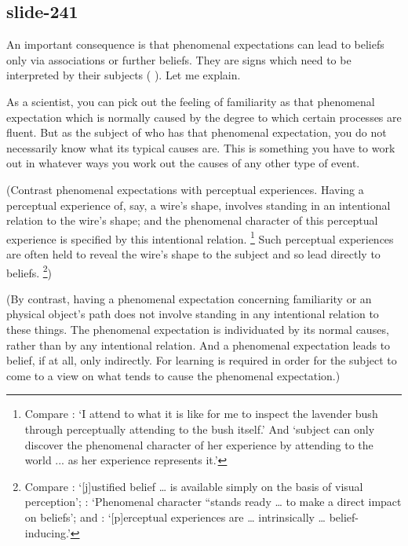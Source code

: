 \documentclass[12pt,\papersize]{extarticle}
\begin{document}
\subsection{slide-241}
An important consequence is that phenomenal expectations can lead to beliefs
only via associations or further beliefs.
They are signs which need to be interpreted by their subjects
(\citealp[Essay~II, Chap.~16, p.~228]{Reid:1785cj}
\citealp[Chap.~VI sect.~III, pp.~164–5]{Reid:1785nz}).
Let me explain.

As a scientist, you can pick out the feeling of familiarity as that
phenomenal expectation which is normally caused by the degree to which
certain processes are fluent.
But as the subject of who has that phenomenal expectation, you do not
necessarily know what its typical causes are.
This is something you have to work out in whatever ways you work out
the causes of any other type of event.

(Contrast phenomenal expectations with perceptual experiences.
Having
a perceptual experience of, say, a wire’s shape, involves standing
in an intentional relation to the wire’s shape; and the phenomenal
character of this perceptual experience is specified by this
intentional relation.%
\footnote{
Compare \citet[p.~380]{Martin:2002yx}:
‘I attend to what it is like for me to inspect the lavender bush through
perceptually attending to the bush itself.’
And \citet[p.~211]{byrne:2001_intentionalism}
‘subject can only discover the phenomenal character of her experience by
attending to the world ... as her experience represents it.’
}
Such perceptual experiences are often held to reveal the wire’s shape to the
subject and so lead directly to beliefs.%
\footnote{
Compare \citet[p.~222]{Johnston:1992zb}:
‘[j]ustified belief … is available simply on the basis of visual perception’;
\citet[p.~143–4]{Tye:1995oa}:
‘Phenomenal character “stands ready … to make a direct impact on beliefs’;
and
\citet[p.~291]{Smith:2001iz}:
‘[p]erceptual experiences are … intrinsically … belief-inducing.’
})

(By contrast, having a phenomenal expectation concerning familiarity or an
physical object’s path does not involve standing in any intentional relation
to these things.
The phenomenal expectation is individuated by its normal causes, rather
than by any intentional relation.
And a phenomenal expectation leads to belief, if at all, only indirectly.
For learning is required in order for the subject to come to a view on
what tends to cause the phenomenal expectation.)
\end{document}

